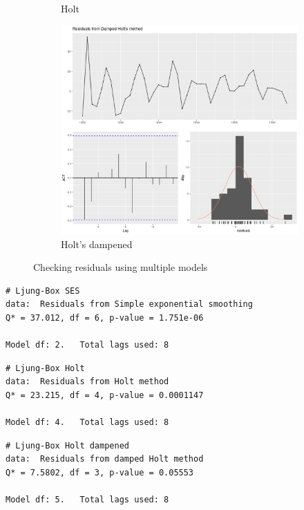 \documentclass[10pt]{article}
\begin{document}
\begin{figure}
\begin{subfigure}{.32\textwidth}
  \caption{Holt}
  \label{fig:holt_resid}
\end{subfigure}
\begin{subfigure}{.32\textwidth}
  \centering
  \includegraphics[width=\linewidth]{img/check_resid_holt_dampend.png}
  \caption{Holt's dampened}
  \label{fig:holt_d_resid}
\end{subfigure}
\caption{Checking residuals using multiple models}
\label{fig:exponential_smoothing}
\end{figure}



\begin{minipage}{.3\textwidth}
  \begin{lstlisting}[basicstyle=\tiny,numbers=none]
# Ljung-Box SES
data:  Residuals from Simple exponential smoothing
Q* = 37.012, df = 6, p-value = 1.751e-06

Model df: 2.   Total lags used: 8
\end{lstlisting}
\end{minipage}
\begin{minipage}{.3\textwidth}
  \begin{lstlisting}[basicstyle=\tiny,numbers=none]
# Ljung-Box Holt
data:  Residuals from Holt method
Q* = 23.215, df = 4, p-value = 0.0001147

Model df: 4.   Total lags used: 8
\end{lstlisting}

\end{minipage}
\begin{minipage}{.3\textwidth}
  \begin{lstlisting}[basicstyle=\tiny,numbers=none]
# Ljung-Box Holt dampened
data:  Residuals from damped Holt method
Q* = 7.5802, df = 3, p-value = 0.05553

Model df: 5.   Total lags used: 8
\end{lstlisting}
\end{minipage}
\label{lst:threemodels}
\end{document}
